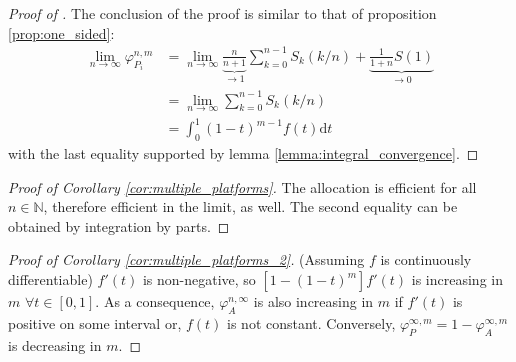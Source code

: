 \documentclass[a4paper]{article}
\newcommand{\dt}{\mathrm{d}t}
\begin{document}
\begin{proof}[Proof of ]
    The conclusion of the proof is similar to that of proposition \ref{prop:one_sided}:
    \begin{align*}
        \lim_{n \to \infty} \varphi_{P_i}^{n, m} &= \lim_{n \to \infty} \underbrace{\frac{n}{n+1}}_{\to 1} \sum_{k=0}^{n-1} S_k(k/n) + \underbrace{\frac{1}{1+n}S(1)}_{\to 0} \\
        &= \lim_{n \to \infty} \sum_{k=0}^{n-1} S_k(k/n) \\
        &= \int_0^1 (1-t)^{m-1} f(t) \dt
    \end{align*}
    with the last equality supported by lemma \ref{lemma:integral_convergence}.
\end{proof}

\begin{proof}[Proof of Corollary \ref{cor:multiple_platforms}]
    The allocation is efficient for all $n \in \mathbb{N}$, therefore efficient in the limit, as well.
    The second equality can be obtained by integration by parts.
\end{proof}

\begin{proof}[Proof of Corollary \ref{cor:multiple_platforms_2}] (Assuming $f$ is continuously differentiable) %
    $f'(t)$ is non-negative, so $[1 - (1-t)^m] f'(t)$ is increasing in $m$ $\forall t \in [0, 1]$.
    As a consequence, $\varphi_A^{n, \infty}$ is also increasing in $m$ if $f'(t)$ is positive on some interval or, $f(t)$ is not constant.
    Conversely, $\varphi_{P}^{\infty, m} = 1 - \varphi_{A}^{\infty, m}$ is decreasing in $m$.
\end{proof}
\end{document}
